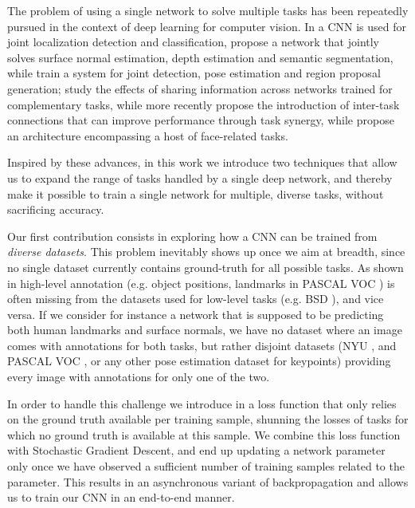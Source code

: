 \documentclass[10pt,twocolumn,letterpaper]{article}
\begin{document}
The problem of using a single network to solve multiple tasks has  been repeatedly pursued  in the context of deep learning for computer vision. In \cite{SEZM+14} a  CNN is used for joint localization  detection and classification,  \cite{Eigen15} propose a network that jointly solves surface normal estimation, depth estimation and semantic segmentation, while  \cite{GkioxariGM15}  train a system for joint detection, pose estimation and region proposal generation; \cite{ishan} study the effects of sharing information across networks trained for complementary tasks, while
more recently \cite{BilenV16} propose the introduction of inter-task connections that can improve performance through task synergy, while \cite{RanjanPC16} propose an architecture encompassing a host of face-related tasks. 


Inspired by these advances, in this work we introduce two techniques that allow us to expand the range of tasks handled by a single deep network, and thereby make it possible to train a single network for multiple, diverse tasks, without sacrificing accuracy. 

Our first contribution consists in exploring how a CNN can be trained from {\em diverse  datasets}. This problem inevitably shows up once we aim at breadth, since no single dataset currently contains ground-truth for all possible tasks. 
As shown in  high-level annotation (e.g. object positions, landmarks in PASCAL VOC \cite{pascal}) is often missing from the  datasets used for low-level tasks (e.g. BSD \cite{MFTM01}), and vice versa. If we consider for instance a network that is supposed to be predicting both human landmarks and surface normals, we have no dataset where an image comes with annotations for both tasks, but rather  disjoint datasets (NYU \cite{nyu}, and PASCAL VOC \cite{pascal}, or any other pose estimation dataset for keypoints) providing every image with annotations for only one of the two. 

In order to handle this challenge we introduce in  a loss function that only relies on the ground truth available per training sample, shunning the losses of tasks for which no ground truth is available at this sample. We combine this  loss function with Stochastic Gradient Descent, and end up updating a network parameter only once we have observed a sufficient number of  training samples related to the parameter. This results in an asynchronous variant of backpropagation and allows us to train our CNN in an end-to-end manner.
\end{document}
